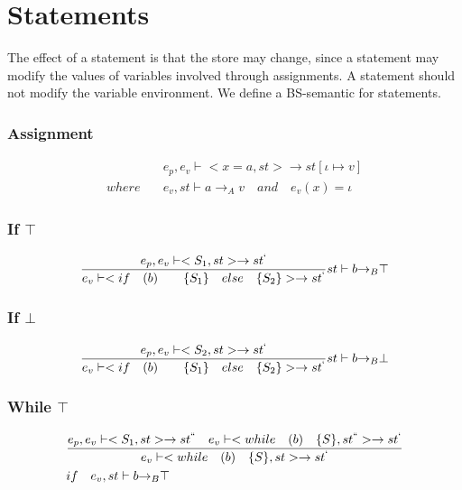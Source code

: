 \section*{Statements}
The effect of a statement is that the store may change, since a statement may modify the values of variables involved through assignments.
A statement should not modify the variable environment.
We define a BS-semantic for statements. 

\subsubsection{Assignment}
\begin{align*}
	&{ e }_{ p },{ e }_{ v }\vdash <x=a,st>\rightarrow st[\iota \mapsto v]\\
	where\quad &{ e }_{ v },st\vdash a{ \rightarrow  }_{ A }v\quad and\quad  { e }_{ v }(x)=\iota 
\end{align*}

\subsubsection{If $\top$}
\begin{equation}
	\frac { { e }_{ p },{ e }_{ v }\vdash <{ S }_{ 1 },st>\rightarrow { st }^{ ` } }{ { e }_{ v }\vdash <if\quad (b)\quad \quad \{{ S }_{ 1 }\}\quad else \quad \{{ S }_{ 2 }\}>\rightarrow { st }^{ ` } } st\vdash b{ \rightarrow  }_{ B }\top 
\end{equation}

\subsubsection{If $\bot$}
\begin{equation}
	\frac { { e }_{ p },{ e }_{ v }\vdash <{ S }_{ 2 },st>\rightarrow { st }^{ ` } }{ { e }_{ v }\vdash <if\quad (b)\quad \quad \{{ S }_{ 1 }\}\quad else \quad \{{ S }_{ 2 }\}>\rightarrow { st }^{ ` } } st\vdash b{ \rightarrow  }_{ B }\bot 
\end{equation}

\subsubsection{While $\top$}
\begin{align*}
	&\frac { { e }_{ p },{ e }_{ v }\vdash <{ S }_{ 1 },st>\rightarrow { st }^{ `` }\quad { e }_{ v }\vdash <while\quad (b)\quad \{S\},{ st }^{ `` }>\rightarrow { st }^{ ` } }{ { e }_{ v }\vdash <while\quad (b)\quad \{S\},st>\rightarrow { st }^{ ` } }\\
	&if\quad { e }_{ v },st\vdash b{ \rightarrow  }_{ B }\top 
\end{align*}


